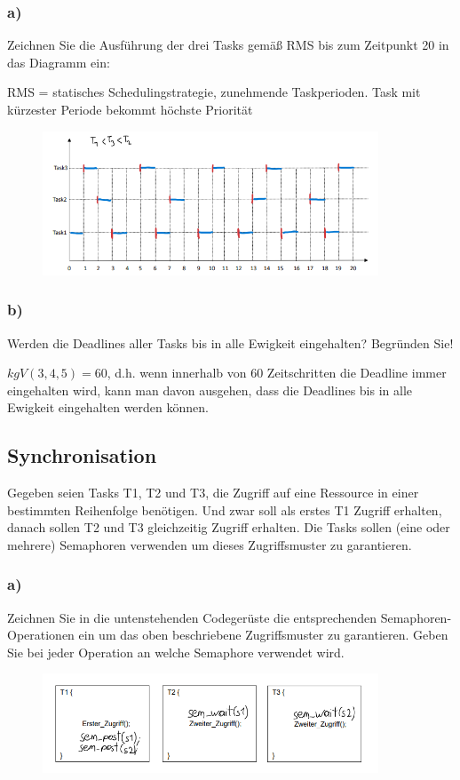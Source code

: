 \subsubsection{a)}
Zeichnen Sie die Ausführung der drei Tasks gemäß RMS bis zum Zeitpunkt 20 in das Diagramm ein:

RMS = statisches Schedulingstrategie, zunehmende Taskperioden. Task mit kürzester Periode bekommt höchste Priorität
\begin{figure}[H]
  \includegraphics[width=10cm]{images/KA020222/2a.PNG}
  \centering
\end{figure}
\subsubsection{b)}
Werden die Deadlines aller Tasks bis in alle Ewigkeit eingehalten? Begründen Sie!

$kgV(3,4,5) = 60$, d.h. wenn innerhalb von 60 Zeitschritten die Deadline immer
eingehalten wird, kann man davon ausgehen, dass die Deadlines bis in alle Ewigkeit 
eingehalten werden können.

\subsection{Synchronisation}
Gegeben seien Tasks T1, T2 und T3, die Zugriff auf eine Ressource in einer bestimmten Reihenfolge
benötigen. Und zwar soll als erstes T1 Zugriff erhalten, danach sollen T2 und T3 gleichzeitig Zugriff erhalten.
Die Tasks sollen (eine oder mehrere) Semaphoren verwenden um dieses Zugriffsmuster zu garantieren.

\subsubsection{a)}
Zeichnen Sie in die untenstehenden Codegerüste die entsprechenden Semaphoren-Operationen ein
um das oben beschriebene Zugriffsmuster zu garantieren. Geben Sie bei jeder Operation an welche
Semaphore verwendet wird.
\begin{figure}[H]
  \includegraphics[width=10cm]{images/KA020222/4a.PNG}
  \centering
\end{figure}

